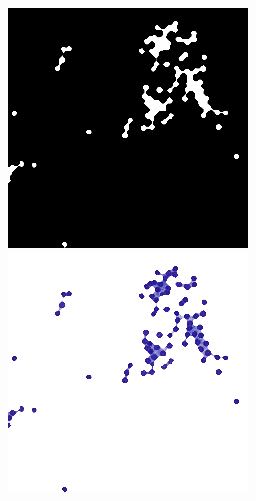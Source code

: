 \begin{figure}
{		\includegraphics[scale=0.5]{image/slide_segmentation_1_out.png}
		\includegraphics[scale=0.5]{image/slide_segmentation_1_masked.png}
	} \\
\end{figure}
